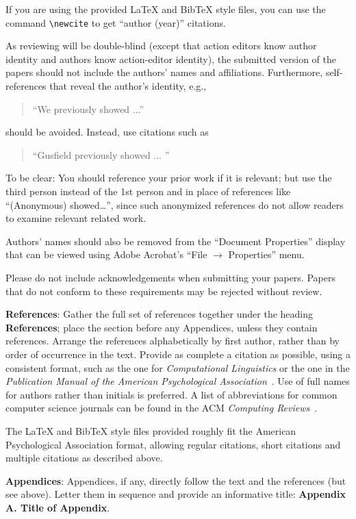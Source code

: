 \documentclass[11pt,letterpaper]{article}
\begin{document}
If you are using the provided \LaTeX{} and Bib\TeX{} style files, you
can use the command \verb|\newcite| to get ``author (year)'' citations.

As reviewing will be double-blind (except that action editors know author identity and authors know action-editor identity), the submitted version of the papers should not include the
authors' names and affiliations. Furthermore, self-references that
reveal the author's identity, e.g.,
\begin{quote}
``We previously showed \cite{Gusfield:97} ...''
\end{quote}
should be avoided. Instead, use citations such as
\begin{quote}
``Gusfield 
previously showed ... ''
\end{quote}

To be clear: You should reference your prior work if it is relevant; but use the third person instead of the 1st person and in place of references like “(Anonymous) showed…”, since such anonymized references do not allow readers to examine relevant related work.

Authors’ names should also be removed from the ``Document Properties'' display that can be viewed using Adobe Acrobat’s ``File $\rightarrow$ Properties'' menu.

Please do not include acknowledgements when submitting your papers. Papers that do not conform
to these requirements may be rejected without review.

\textbf{References}: Gather the full set of references together under
the heading {\bf References}; place the section before any Appendices,
unless they contain references. Arrange the references alphabetically
by first author, rather than by order of occurrence in the text.
Provide as complete a citation as possible, using a consistent format,
such as the one for {\em Computational Linguistics\/} or the one in the
{\em Publication Manual of the American
Psychological Association\/}~\cite{APA:83}.  Use of full names for
authors rather than initials is preferred.  A list of abbreviations
for common computer science journals can be found in the ACM
{\em Computing Reviews\/}~\cite{ACM:83}.

The \LaTeX{} and Bib\TeX{} style files provided roughly fit the
American Psychological Association format, allowing regular citations,
short citations and multiple citations as described above.

{\bf Appendices}: Appendices, if any, directly follow the text and the
references (but see above).  Letter them in sequence and provide an
informative title: {\bf Appendix A. Title of Appendix}.
\end{document}
